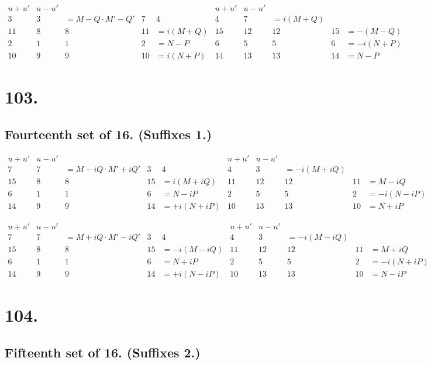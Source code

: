 \documentclass[11pt,a4paper]{article}
\begin{document}
\[
\begin{array}{c|cccc|c|cccc}
u+u' & u-u' & & & & u+u' & u-u' & & & \\
\hline
3 & 3 & = M-Q \cdot M'-Q' & 7 & 4 & 4 & 7 & = i(M+Q) \\
11 & 8 & 8 & 11 & = i(M+Q) & 15 & 12 & 12 & 15 & = -(M-Q) \\
2 & 1 & 1 & 2 & = N-P & 6 & 5 & 5 & 6 & = -i(N+P) \\
10 & 9 & 9 & 10 & = i(N+P) & 14 & 13 & 13 & 14 & = N-P
\end{array}
\]

\newpage
\section*{103.}
\label{sec:103}

\subsection*{Fourteenth set of 16. (Suffixes 1.)}

\[
\begin{array}{c|cccc|c|cccc}
u+u' & u-u' & & & & u+u' & u-u' & & & \\
\hline
7 & 7 & = M-iQ \cdot M'+iQ' & 3 & 4 & 4 & 3 & = -i(M+iQ) \\
15 & 8 & 8 & 15 & = i(M+iQ) & 11 & 12 & 12 & 11 & = M-iQ \\
6 & 1 & 1 & 6 & = N-iP & 2 & 5 & 5 & 2 & = -i(N-iP) \\
14 & 9 & 9 & 14 & = +i(N+iP) & 10 & 13 & 13 & 10 & = N+iP
\end{array}
\]

\[
\begin{array}{c|cccc|c|cccc}
u+u' & u-u' & & & & u+u' & u-u' & & & \\
\hline
7 & 7 & = M+iQ \cdot M'-iQ' & 3 & 4 & 4 & 3 & = -i(M-iQ) \\
15 & 8 & 8 & 15 & = -i(M-iQ) & 11 & 12 & 12 & 11 & = M+iQ \\
6 & 1 & 1 & 6 & = N+iP & 2 & 5 & 5 & 2 & = -i(N+iP) \\
14 & 9 & 9 & 14 & = +i(N-iP) & 10 & 13 & 13 & 10 & = N-iP
\end{array}
\]

\newpage
\section*{104.}
\label{sec:104}

\subsection*{Fifteenth set of 16. (Suffixes 2.)}
\end{document}
